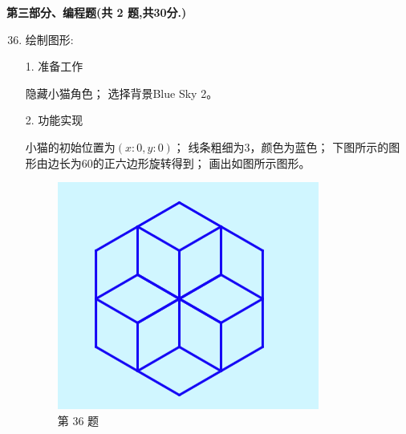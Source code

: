 \documentclass[10pt, a4paper]{article}
\begin{document}
    \newpage
    {\noindent \textbf{第三部分、编程题(共 2 题,共30分.)}}
    \begin{enumerate}
        \setcounter{enumi}{35}
        
        \item 绘制图形:
        
        1. 准备工作
        \begin{tasks}[label = (\arabic*)]
            \task 隐藏小猫角色；
            \task 选择背景Blue Sky 2。
        \end{tasks}
        2. 功能实现
        \begin{tasks}[label = (\arabic*)]
            \task 小猫的初始位置为$(x:0,y:0)$；
            \task 线条粗细为3，颜色为蓝色；
            \task 下图所示的图形由边长为60的正六边形旋转得到；
            \task 画出如图所示图形。
        \end{tasks}
        \begin{figure}[htbp]
            \centering
            \begin{minipage}[t]{.34\textwidth}
                \centering
                \includegraphics[width=\textwidth]{36.png}
                \caption*{第 36 题}
            \end{minipage}
            \begin{minipage}[t]{.4\textwidth}
                \centering

\end{minipage}
\end{figure}
\end{enumerate}
\end{document}
